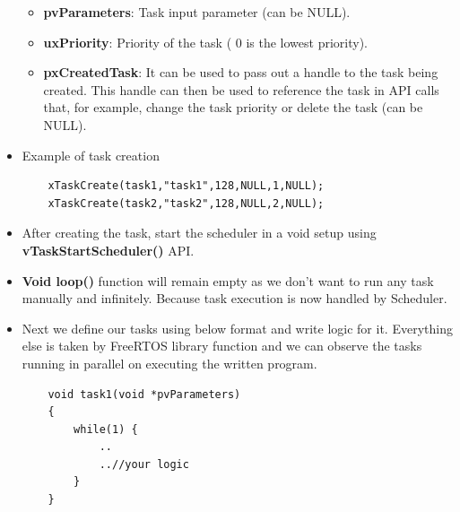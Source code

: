 \begin{itemize}
\begin{itemize}
        \item \textbf{pvParameters}: Task input parameter (can be NULL).
        \item \textbf{uxPriority}: Priority of the task ( 0 is the lowest priority).
        \item \textbf{pxCreatedTask}: It can be used to pass out a handle to the task being created. This handle can then be used to reference the task in API calls that, for example, change the task priority or delete the task (can be NULL).
    \end{itemize}
    \item Example of task creation
    \begin{lstlisting}
    xTaskCreate(task1,"task1",128,NULL,1,NULL);
    xTaskCreate(task2,"task2",128,NULL,2,NULL);  
    \end{lstlisting}
    \item After creating the task, start the scheduler in a void setup using \textbf{vTaskStartScheduler()} API.
    \item \textbf{Void loop()} function will remain empty as we don’t want to run any task manually and infinitely. Because task execution is now handled by Scheduler.
    \item Next we define our tasks using below format and write logic for it. Everything else is taken by FreeRTOS library function and we can observe the tasks running in parallel on executing the written program.
    \begin{lstlisting}
    void task1(void *pvParameters)  
    {
        while(1) {
            ..
            ..//your logic
        }
    }
    \end{lstlisting}
\end{itemize}







